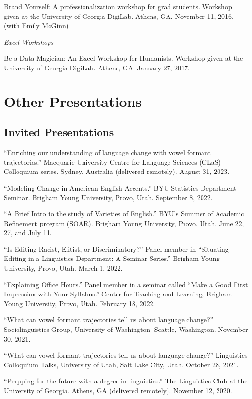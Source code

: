 \documentclass[
]{article}
\begin{document}
Brand Yourself: A professionalization workshop for grad students.
Workshop given at the University of Georgia DigiLab. Athens, GA.
November 11, 2016. (with Emily McGinn)

\emph{Excel Workshops}

Be a Data Magician: An Excel Workshop for Humanists. Workshop given at
the University of Georgia DigiLab. Athens, GA. January 27, 2017.

\hypertarget{other-presentations}{%
\section{Other Presentations}\label{other-presentations}}

\hypertarget{invited-presentations}{%
\subsection{Invited Presentations}\label{invited-presentations}}

``Enriching our understanding of language change with vowel formant
trajectories.'' Macquarie University Centre for Language Sciences (CLaS)
Colloquium series. Sydney, Australia (delivered remotely). August 31,
2023.

``Modeling Change in American English Accents.'' BYU Statistics
Department Seminar. Brigham Young University, Provo, Utah. September 8,
2022.

``A Brief Intro to the study of Varieties of English.'' BYU's Summer of
Academic Refinement program (SOAR). Brigham Young University, Provo,
Utah. June 22, 27, and July 11.

``Is Editing Racist, Elitist, or Discriminatory?'' Panel member in
``Situating Editing in a Linguistics Department: A Seminar Series.''
Brigham Young University, Provo, Utah. March 1, 2022.

``Explaining Office Hours.'' Panel member in a seminar called ``Make a
Good First Impression with Your Syllabus.'' Center for Teaching and
Learning, Brigham Young University, Provo, Utah. February 18, 2022.

``What can vowel formant trajectories tell us about language change?''
Sociolinguistics Group, University of Washington, Seattle, Washington.
November 30, 2021.

``What can vowel formant trajectories tell us about language change?''
Linguistics Colloquium Talks, University of Utah, Salt Lake City, Utah.
October 28, 2021.

``Prepping for the future with a degree in linguistics.'' The
Linguistics Club at the University of Georgia. Athens, GA (delivered
remotely). November 12, 2020.
\end{document}
